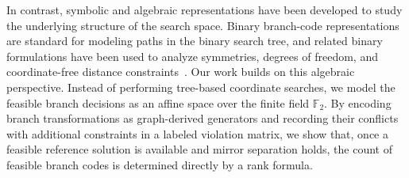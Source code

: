 In contrast, symbolic and algebraic representations have been developed to study the underlying structure of the search space. Binary branch-code representations are standard for modeling paths in the binary search tree, and related binary formulations have been used to analyze symmetries, degrees of freedom, and coordinate-free distance constraints~\cite{mucherino2012exploiting,goncalves2021new,mucherino2020analysis}. Our work builds on this algebraic perspective. Instead of performing tree-based coordinate searches, we model the feasible branch decisions as an affine space over the finite field $\mathbb{F}_2$. By encoding branch transformations as graph-derived generators and recording their conflicts with additional constraints in a labeled violation matrix, we show that, once a feasible reference solution is available and mirror separation holds, the count of feasible branch codes is determined directly by a rank formula.
